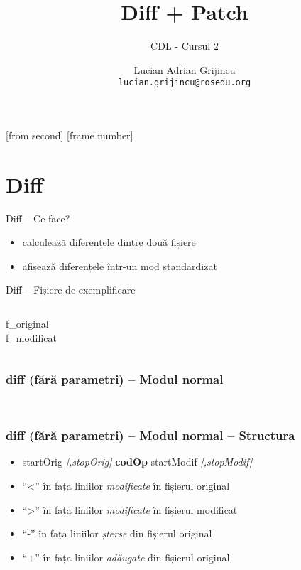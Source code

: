 \documentclass{beamer}
\title[Diff \+ Patch]{Diff + Patch}
\subtitle{CDL - Cursul 2}
\institute{ROSEdu}
\author{Lucian Adrian Grijincu \\ \texttt{lucian.grijincu@rosedu.org}}
\begin{document}
[from second]
[frame number]

\frame{\titlepage}

\frame{\tableofcontents}

\section{Diff}

\frame{\tableofcontents[currentsection]}

\begin{frame}{Diff – Ce face?}
\begin{itemize} %
  \item calculează diferențele dintre două fișiere
  \item afișează diferențele într-un mod standardizat
\end{itemize}
\end{frame}


\begin{frame}{Diff – Fișiere de exemplificare}
  \begin{columns}[t]
    \column{5cm}
    {\LARGE{f\_original}}\\
    {\tt{\small }}
    \column{5cm}
    {\LARGE{f\_modificat}}\\
    {\tt \small }
  \end{columns}
\end{frame}

\begin{frame}
  \frametitle{\textbf{diff} (fără parametri) – Modul normal}
  \tt 
\end{frame}

\begin{frame}
  \frametitle{\textbf{diff} (fără parametri) – Modul normal – Structura}
  \begin{itemize}
    \item startOrig \textit{[,stopOrig]} \textbf{codOp} startModif \textit{[,stopModif]}
    \item ``\textless'' în fața liniilor \textit{modificate} în fișierul original
    \item ``\textgreater'' în fața liniilor \textit{modificate} în fișierul modificat
    \item ``-'' în fața liniilor \textit{șterse} din fișierul original
    \item ``+'' în fața liniilor \textit{adăugate} din fișierul original
  \end{itemize}
\end{frame}
\end{document}
